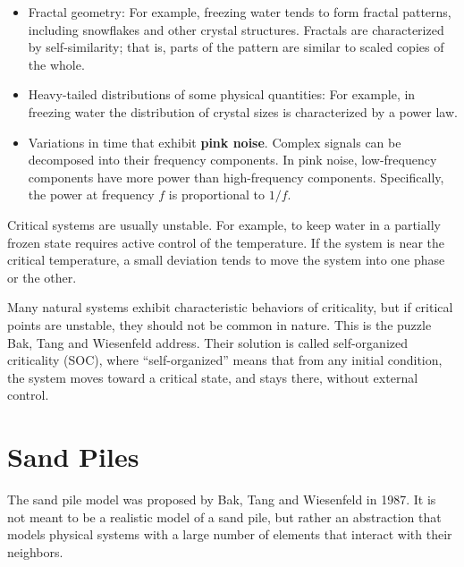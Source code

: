 \documentclass[12pt]{book}
\theoremstyle{exercise}
\begin{document}
\begin{itemize}

\item Fractal geometry: For example, freezing water tends to form
  fractal patterns, including snowflakes and other crystal
  structures.  Fractals are characterized by self-similarity; that is,
  parts of the pattern are similar to scaled copies of the whole.


\item Heavy-tailed distributions of some physical quantities: For
  example, in freezing water the distribution of crystal sizes is
  characterized by a power law.


\item Variations in time that exhibit {\bf pink noise}.  Complex
  signals can be decomposed into their frequency components.  In pink
  noise, low-frequency components have more power than high-frequency
  components.  Specifically, the power at frequency $f$ is
  proportional to $1/f$.


\end{itemize}

Critical systems are usually unstable.  For example, to keep water in
a partially frozen state requires active control of the temperature.
If the system is near the critical temperature, a small deviation
tends to move the system into one phase or the other.


Many natural systems exhibit characteristic behaviors of criticality,
but if critical points are unstable, they should not be common in
nature.  This is the puzzle Bak, Tang and Wiesenfeld address.  Their
solution is called self-organized criticality (SOC), where
``self-organized'' means that from any initial condition, the system
moves toward a critical state, and stays there, without
external control.


\section{Sand Piles}

The sand pile model was proposed by Bak, Tang and Wiesenfeld in 1987.
It is not meant to be a realistic model of a sand pile, but rather an
abstraction that models physical systems with a large number of
elements that interact with their neighbors.
\end{document}
